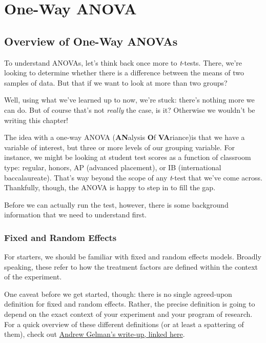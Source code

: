 
\chapter{One-Way ANOVA}

\section{Overview of One-Way ANOVAs}

To understand ANOVAs, let's think back once more to \textit{t}-tests. There, we're looking to determine whether there is a difference between the means of two samples of data. But that if we want to look at more than two groups? 

Well, using what we've learned up to now, we're stuck: there's nothing more we can do. But of course that's not \textit{really} the case, is it? Otherwise we wouldn't be writing this chapter!

The idea with a one-way ANOVA (\textbf{AN}alysis \textbf{O}f \textbf{VA}riance)is that we have a variable of interest, but three or more levels of our grouping variable. For instance, we might be looking at student test scores as a function of classroom type: regular, honors, AP (advanced placement), or IB (international baccalaureate). That's way beyond the scope of any \textit{t}-test that we've come across. Thankfully, though, the ANOVA is happy to step in to fill the gap.

Before we can actually run the test, however, there is some background information that we need to understand first.

\subsection{Fixed and Random Effects}

For starters, we should be familiar with fixed and random effects models. Broadly speaking, these refer to how the treatment factors are defined within the context of the experiment.

One caveat before we get started, though: there is no single agreed-upon definition for fixed and random effects. Rather, the precise definition is going to depend on the exact context of your experiment and your program of research. For a quick overview of these different definitions (or at least a spattering of them), check out \href{http://andrewgelman.com/2005/01/25/why_i_dont_use/}{Andrew Gelman's write-up, linked here}.

